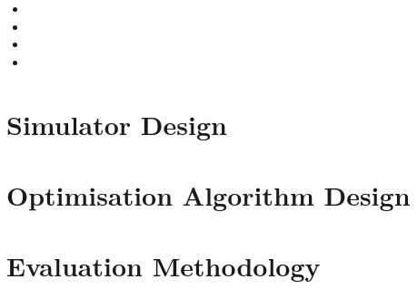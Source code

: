 \begin{itemize}
\item 
\item 
\item 
\item 
\end{itemize}


\section{Simulator Design}

\section{Optimisation Algorithm Design}

\section{Evaluation Methodology}




